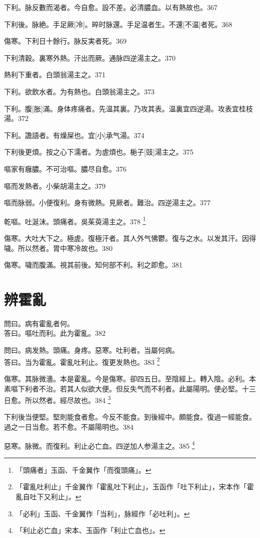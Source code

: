 \documentclass[12pt,twoside,UTF8,b5paper]{ctexbook}
\begin{document}
下利。脉反數而渴者。今自愈。設不差。必清膿血。以有熱故也。367

下利後。脉絶。手足厥[冷]。晬时脉還。手足温者生。不還[不温]者死。368

傷寒。下利日十餘行。脉反実者死。369

下利清穀。裏寒外熱。汗出而厥。通脉四逆湯主之。370

熱利下重者。白頭翁湯主之。371

下利。欲飲水者。为有熱也。白頭翁湯主之。373

下利。腹[胀]滿。身体疼痛者。先温其裏。乃攻其表。温裏宜四逆湯。攻表宜桂枝湯。372

下利。譫語者。有燥屎也。宜[小]承气湯。374

下利後更煩。按之心下濡者。为虗煩也。梔子[豉]湯主之。375

嘔家有癰膿。不可治嘔。膿尽自愈。376

嘔而发熱者。小柴胡湯主之。379

嘔而脉弱。小便復利。身有微熱。見厥者。難治。四逆湯主之。377

乾嘔。吐涎沫。頭痛者。吳茱萸湯主之。378
	\footnote{「頭痛者」玉函、千金翼作「而復頭痛」。}

傷寒。大吐大下之。極虗。復極汗者。其人外气怫鬱。復与之水。以发其汗。因得噦。所以然者。胃中寒冷故也。380

傷寒。噦而腹滿。視其前後。知何部不利。利之即愈。381

\chapter{辨霍亂}

問曰。病有霍亂者何。\\
答曰。嘔吐而利。此为霍亂。382

問曰。病发熱。頭痛。身疼。惡寒。吐利者。当屬何病。\\
答曰。当为霍亂。霍亂吐利止。復更发熱也。383
	\footnote{「霍亂吐利止」千金翼作「霍亂吐下利止」，玉函作「吐下利止」，宋本作「霍亂自吐下又利止」。}

傷寒。其脉微濇。本是霍亂。今是傷寒。卻四五日。至陰經上。轉入陰。必利。本素嘔下利者不治。若其人似欲大便。但反失气而不利者。此屬陽明。便必堅。十三日愈。所以然者。經尽故也。384
	\footnote{「必利」玉函、千金翼作「当利」，脉經作「必吐利」。}

下利後当便堅。堅則能食者愈。今反不能食。到後經中。頗能食。復過一經能食。過之一日当愈。若不愈。不屬陽明也。384

惡寒。脉微。而復利。利止必亡血。四逆加人参湯主之。385
	\footnote{「利止必亡血」宋本、玉函作「利止亡血也」。}
\end{document}
